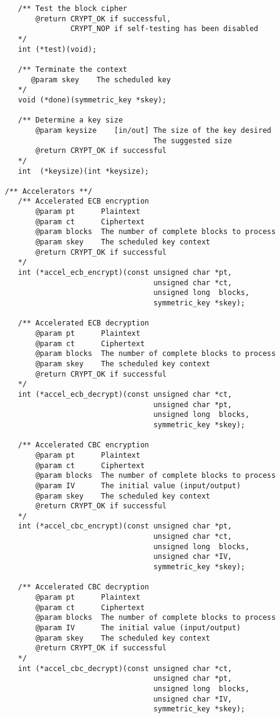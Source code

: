 \documentclass[synpaper]{book}
\begin{document}
\begin{small}
\begin{verbatim}
   /** Test the block cipher
       @return CRYPT_OK if successful, 
               CRYPT_NOP if self-testing has been disabled
   */
   int (*test)(void);

   /** Terminate the context 
      @param skey    The scheduled key
   */
   void (*done)(symmetric_key *skey);      

   /** Determine a key size
       @param keysize    [in/out] The size of the key desired  
                                  The suggested size
       @return CRYPT_OK if successful
   */
   int  (*keysize)(int *keysize);

/** Accelerators **/
   /** Accelerated ECB encryption 
       @param pt      Plaintext
       @param ct      Ciphertext
       @param blocks  The number of complete blocks to process
       @param skey    The scheduled key context
       @return CRYPT_OK if successful
   */
   int (*accel_ecb_encrypt)(const unsigned char *pt, 
                                  unsigned char *ct, 
                                  unsigned long  blocks, 
                                  symmetric_key *skey);

   /** Accelerated ECB decryption 
       @param pt      Plaintext
       @param ct      Ciphertext
       @param blocks  The number of complete blocks to process
       @param skey    The scheduled key context
       @return CRYPT_OK if successful
   */
   int (*accel_ecb_decrypt)(const unsigned char *ct, 
                                  unsigned char *pt, 
                                  unsigned long  blocks, 
                                  symmetric_key *skey);

   /** Accelerated CBC encryption 
       @param pt      Plaintext
       @param ct      Ciphertext
       @param blocks  The number of complete blocks to process
       @param IV      The initial value (input/output)
       @param skey    The scheduled key context
       @return CRYPT_OK if successful
   */
   int (*accel_cbc_encrypt)(const unsigned char *pt, 
                                  unsigned char *ct, 
                                  unsigned long  blocks, 
                                  unsigned char *IV, 
                                  symmetric_key *skey);

   /** Accelerated CBC decryption 
       @param pt      Plaintext
       @param ct      Ciphertext
       @param blocks  The number of complete blocks to process
       @param IV      The initial value (input/output)
       @param skey    The scheduled key context
       @return CRYPT_OK if successful
   */
   int (*accel_cbc_decrypt)(const unsigned char *ct, 
                                  unsigned char *pt, 
                                  unsigned long  blocks, 
                                  unsigned char *IV, 
                                  symmetric_key *skey);


\end{verbatim}
\end{small}
\end{document}
